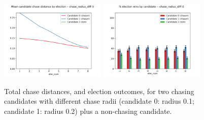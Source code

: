 \begin{figure}[ht]
\centering
\includegraphics[width=0.45\textwidth]{assets/diff_chase_radii_dists.png}
\includegraphics[width=0.45\textwidth]{assets/diff_chase_radii_winners.png}
\caption{Total chase distances, and election outcomes, for two chasing
candidates with different chase radii (candidate 0: radius 0.1; candidate 1:
radius 0.2) plus a non-chasing candidate.}
\label{diff_chase_radius}
\end{figure}










